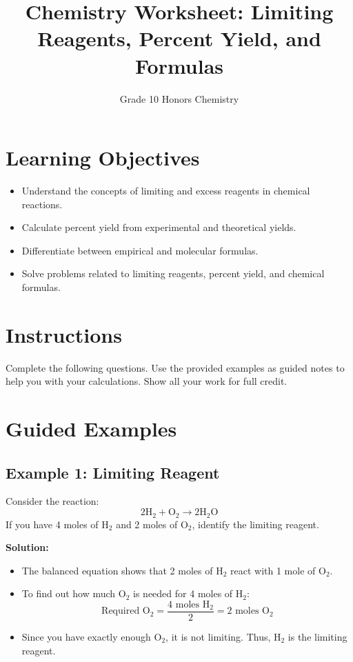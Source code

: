 \documentclass{article}
\title{Chemistry Worksheet: Limiting Reagents, Percent Yield, and Formulas}
\author{Grade 10 Honors Chemistry}
\date{}
\begin{document}
\maketitle

\section*{Learning Objectives}
\begin{itemize}
    \item Understand the concepts of limiting and excess reagents in chemical reactions.
    \item Calculate percent yield from experimental and theoretical yields.
    \item Differentiate between empirical and molecular formulas.
    \item Solve problems related to limiting reagents, percent yield, and chemical formulas.
\end{itemize}

\section*{Instructions}
Complete the following questions. Use the provided examples as guided notes to help you with your calculations. Show all your work for full credit.

\section*{Guided Examples}
\subsection*{Example 1: Limiting Reagent}
Consider the reaction:
\[
2 \text{H}_2 + \text{O}_2 \rightarrow 2 \text{H}_2\text{O}
\]
If you have 4 moles of \(\text{H}_2\) and 2 moles of \(\text{O}_2\), identify the limiting reagent.

\textbf{Solution:}
\begin{itemize}
    \item The balanced equation shows that 2 moles of \(\text{H}_2\) react with 1 mole of \(\text{O}_2\).
    \item To find out how much \(\text{O}_2\) is needed for 4 moles of \(\text{H}_2\):
    \[
    \text{Required } \text{O}_2 = \frac{4 \text{ moles H}_2}{2} = 2 \text{ moles O}_2
    \]
    \item Since you have exactly enough \(\text{O}_2\), it is not limiting. Thus, \(\text{H}_2\) is the limiting reagent.
\end{itemize}
\end{document}
